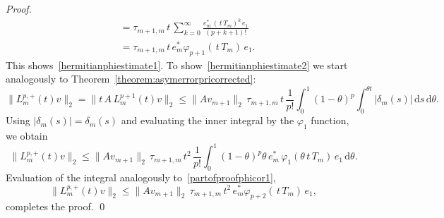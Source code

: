 \documentclass[smallextended]{svjour3pre}%
\numberwithin{equation}{section}
\numberwithin{figure}{section}
\numberwithin{table}{section}
\newcommand\phif\varphi
\newcommand{\dd}{\mathrm{d}}
\newcommand\Opgen{A}
\begin{document}
\begin{proof}
\begin{equation}
\begin{aligned}
&= \tau_{m+1,m}\,t\,\sum_{k=0}^{\infty} \frac{e_m^\ast \,(\,t\,T_m)^k \, e_1}{(p+k+1)!}\\
&= \tau_{m+1,m}\,t\,e_m^\ast \phif_{p+1}(\,t\,T_m) \, e_1.
\end{aligned}
\end{equation}
This shows~\eqref{hermitianphiestimate1}.
To show~\eqref{hermitianphiestimate2} we start analogously to Theorem~\ref{theorem:asymerrorpricorrected}:
\begin{equation*}
\|L^{p,+}_m(t)v\|_2 = \|t\,\Opgen\,L^{p+1}_m(t)v\|_2 \leq \|\Opgen v_{m+1}\|_2\,\tau_{m+1,m} \,t\, \frac{1}{p!} \int_0^1 (1-\theta)^{p} \int_0^{\theta t}  |\delta_m( s)|\,\dd s \,\dd \theta.
\end{equation*}
Using $|\delta_m(s)|=\delta_m(s)$ and evaluating the inner integral by the $\phif_1$ function, we obtain
\begin{equation*}
\|L^{p,+}_m(t)v\|_2 \leq \|\Opgen v_{m+1}\|_2\,\tau_{m+1,m}\,t^2\,\frac{1}{p!} \int_0^1 (1-\theta)^{p} \theta \, e_m^\ast \, \phif_1(\theta\,t\,T_m) \, e_1  \,\dd \theta.
\end{equation*}
Evaluation of the integral analogously to~\eqref{partofproofphicor1},
\begin{equation*}
\|L^{p,+}_m(t)v\|_2 \leq \|\Opgen v_{m+1}\|_2\,\tau_{m+1,m}\,t^2\,e_m^\ast \phif_{p+2}(\,t\,T_m) \, e_1,
\end{equation*}
completes the proof. \hfill\qed
\end{proof}

\end{document}
